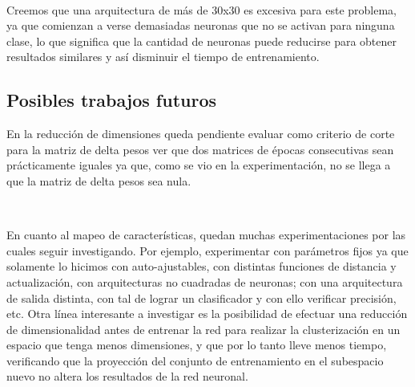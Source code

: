 \documentclass[informe.tex]{subfiles}
\begin{document}
    ~
    
    Creemos que una arquitectura de más de 30x30 es excesiva para este problema, ya que comienzan a verse demasiadas neuronas que no se activan para ninguna clase, lo que significa que la cantidad de neuronas puede reducirse para obtener resultados similares y as\'i disminuir el tiempo de entrenamiento.
  
    \subsection{Posibles trabajos futuros}
    
    En la reducción de dimensiones queda pendiente evaluar como criterio de corte para la matriz de delta pesos ver que dos matrices de épocas consecutivas sean prácticamente iguales ya que, como se vio en la experimentación, no se llega a que la matriz de delta pesos sea nula.
    
    ~
    
    En cuanto al mapeo de características, quedan muchas experimentaciones por las cuales seguir investigando. Por ejemplo, experimentar con par\'ametros fijos ya que solamente lo hicimos con auto-ajustables, con distintas funciones de distancia y actualizaci\'on, con arquitecturas no cuadradas de neuronas; con una arquitectura de salida distinta, con tal de lograr un clasificador y con ello verificar precisi\'on, etc. Otra línea interesante a investigar es la posibilidad de efectuar una reducción de dimensionalidad antes de entrenar la red para realizar la clusterizaci\'on en un espacio que tenga menos dimensiones, y que por lo tanto lleve menos tiempo, verificando que la proyecci\'on del conjunto de entrenamiento en el subespacio nuevo no altera los resultados de la red neuronal.
    
\end{document}

